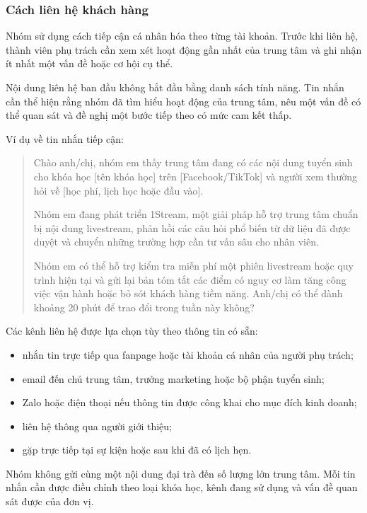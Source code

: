 \subsubsection{Cách liên hệ khách hàng}

Nhóm sử dụng cách tiếp cận cá nhân hóa theo từng tài khoản. Trước khi liên hệ, thành viên phụ trách cần xem xét hoạt động gần nhất của trung tâm và ghi nhận ít nhất một vấn đề hoặc cơ hội cụ thể.

Nội dung liên hệ ban đầu không bắt đầu bằng danh sách tính năng. Tin nhắn cần thể hiện rằng nhóm đã tìm hiểu hoạt động của trung tâm, nêu một vấn đề có thể quan sát và đề nghị một bước tiếp theo có mức cam kết thấp.

Ví dụ về tin nhắn tiếp cận:

\begin{quote}
Chào anh/chị, nhóm em thấy trung tâm đang có các nội dung tuyển sinh cho khóa học [tên khóa học] trên [Facebook/TikTok] và người xem thường hỏi về [học phí, lịch học hoặc đầu vào].

Nhóm em đang phát triển 1Stream, một giải pháp hỗ trợ trung tâm chuẩn bị nội dung livestream, phản hồi các câu hỏi phổ biến từ dữ liệu đã được duyệt và chuyển những trường hợp cần tư vấn sâu cho nhân viên.

Nhóm em có thể hỗ trợ kiểm tra miễn phí một phiên livestream hoặc quy trình hiện tại và gửi lại bản tóm tắt các điểm có nguy cơ làm tăng công việc vận hành hoặc bỏ sót khách hàng tiềm năng. Anh/chị có thể dành khoảng 20 phút để trao đổi trong tuần này không?
\end{quote}

Các kênh liên hệ được lựa chọn tùy theo thông tin có sẵn:

\begin{itemize}
    \item nhắn tin trực tiếp qua fanpage hoặc tài khoản cá nhân của người phụ trách;
    \item email đến chủ trung tâm, trưởng marketing hoặc bộ phận tuyển sinh;
    \item Zalo hoặc điện thoại nếu thông tin được công khai cho mục đích kinh doanh;
    \item liên hệ thông qua người giới thiệu;
    \item gặp trực tiếp tại sự kiện hoặc sau khi đã có lịch hẹn.
\end{itemize}

Nhóm không gửi cùng một nội dung đại trà đến số lượng lớn trung tâm. Mỗi tin nhắn cần được điều chỉnh theo loại khóa học, kênh đang sử dụng và vấn đề quan sát được của đơn vị.

